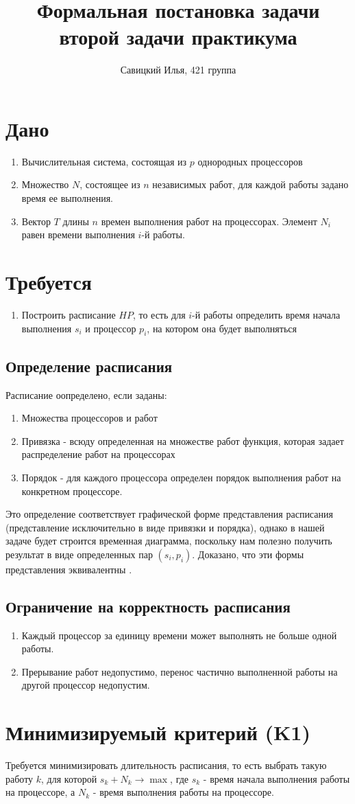 \documentclass{article}
\title{Формальная постановка задачи второй задачи практикума}
\author{Савицкий Илья, 421 группа}
\date{}
\begin{document}
\maketitle
\section*{Дано}
\begin{enumerate}
    \item Вычислительная система, состоящая из $p$ однородных процессоров
    \item Множество $N$, состоящее из $n$ независимых работ, для каждой работы задано время ее выполнения.
    \item Вектор $T$ длины $n$ времен выполнения работ на процессорах. Элемент $N_i$ равен времени выполнения $i$-й работы. 
\end{enumerate}
\section*{Требуется}
\begin{enumerate}
    \item Построить расписание $HP$, то есть для $i$-й работы определить время начала выполнения $s_i$ и процессор $p_i$, на котором она будет выполняться
\end{enumerate}
\subsection*{Определение расписания}
Расписание оопределено, если заданы:
\begin{enumerate}
    \item Множества процессоров и работ
    \item Привязка - всюду определенная на множестве работ функция, которая задает распределение работ на процессорах
    \item Порядок - для каждого процессора определен порядок выполнения работ на конкретном процессоре.
\end{enumerate}
Это определение соответствует графической форме представления расписания (представление исключительно в виде привязки и порядка), однако в нашей задаче будет строится временная диаграмма, поскольку нам полезно получить результат в виде определенных пар $\left( s_i, p_i \right)$. Доказано, что эти формы представления эквивалентны \cite{Kalashnikov_2004}.
\subsection*{Ограничение на корректность расписания}
    \begin{enumerate}
        \item Каждый процессор за единицу времени может выполнять не больше одной работы.
        \item Прерывание работ недопустимо, перенос частично выполненной работы на другой процессор недопустим.
    \end{enumerate}
\section*{Минимизируемый критерий (K1)}
Требуется минимизировать длительность расписания, то есть выбрать такую работу $k$, для которой $s_k + N_k \rightarrow \max$, где $s_k$ - время начала выполнения работы на процессоре, а $N_k$ - время выполнения работы на процессоре.  
\printbibliography
\end{document}
